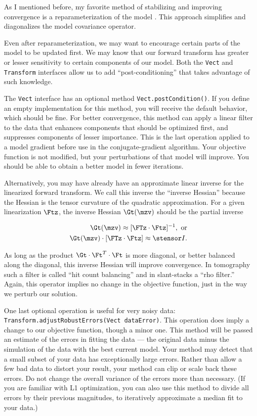 \documentclass[12pt]{article}
\begin{document}
As I mentioned before, my favorite method of
stabilizing and improving convergence is a
reparameterization of the model
\cite{harlan-model}.  This approach
simplifies and diagonalizes the model
covariance operator.

Even after reparameterization, we may want to
encourage certain parts of the model to be
updated first.  We may know that our forward
transform has greater or lesser sensitivity
to certain components of our model.  Both the
\texttt{Vect} and \texttt{Transform}
interfaces allow us to add
``post-conditioning'' that takes advantage of
such knowledge.

The \texttt{Vect} interface has an optional
method \texttt{Vect.\urlbr{}postCondition()}.
If you define an empty implementation for
this method, you will receive the default
behavior, which should be fine.  For better
convergence, this method can apply a linear
filter to the data that enhances components
that should be optimized first, and
suppresses components of lesser importance.
This is the last operation applied to a model
gradient before use in the conjugate-gradient
algorithm.  Your objective function is not
modified, but your perturbations of that
model will improve.  You should be able to
obtain a better model in fewer iterations.

Alternatively, you may have already have an
approximate linear inverse for the linearized
forward transform.  We call this inverse the
``inverse Hessian'' because the Hessian is
the tensor curvature of the quadratic
approximation.  For a given linearization
$\Ftz$, the inverse Hessian $\Gt ( \mzv )$
should be the partial inverse

\begin{eqnarray}
\Gt ( \mzv ) \approx [ \FTz \cdot \Ftz ]^{-1}, ~ \mbox{or} \\
\Gt ( \mzv ) \cdot [ \FTz \cdot \Ftz] \approx {{\stensor I}}.
\end{eqnarray}

\noindent As long as the product $\Gt \cdot
\Ft^T \cdot \Ft$ is more diagonal, or better
balanced along the diagonal, this inverse
Hessian will improve convergence.  In
tomography such a filter is called ``hit
count balancing'' and in slant-stacks a ``rho
filter.'' Again, this operator implies no
change in the objective function, just in the
way we perturb our solution.

One last optional operation is useful for
very noisy data:
\texttt{Transform.\urlbr{}adjust\-Robust\-Errors(Vect
data\-Error)}.  This operation does imply a
change to our objective function, though a
minor one.  This method will be passed an
estimate of the errors in fitting the data
--- the original data minus the simulation of
the data with the best current model.  Your
method may detect that a small subset of your
data has exceptionally large errors.  Rather
than allow a few bad data to distort your
result, your method can clip or scale back
these errors.  Do not change the overall
variance of the errors more than necessary.
(If you are familiar with L1 optimization,
you can also use this method to divide all
errors by their previous magnitudes, to
iteratively approximate a median fit to your
data.)
\end{document}
